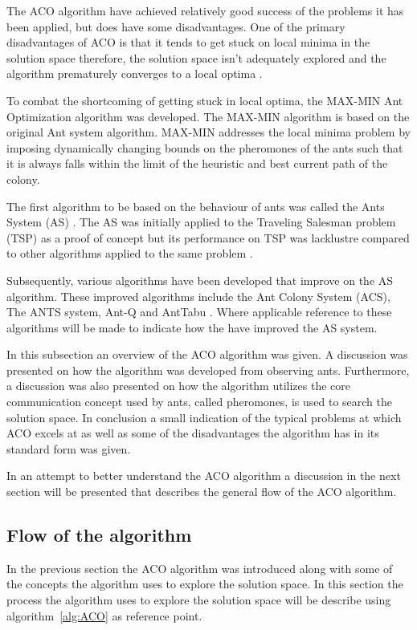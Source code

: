 The ACO algorithm have achieved relatively good success of the problems it has been applied, but does have some disadvantages\cite{ImpACOComplex,ACOSurvey}. One of the primary disadvantages of ACO is that it tends to get stuck on local minima in the solution space therefore, the solution space isn't adequately explored and the algorithm prematurely converges to a local optima \cite{ImpACOComplex}.

To combat the shortcoming of getting stuck in local optima, the MAX-MIN Ant Optimization algorithm was developed. The MAX-MIN algorithm is based on the original Ant system algorithm. MAX-MIN addresses the local minima problem by imposing dynamically changing bounds on the pheromones of the ants such that it is always falls within the limit of the heuristic and best current path of the colony\cite{GangWangACO}.

The first algorithm to be based on the behaviour of ants was called the Ants System (AS) \cite{CompuIntelligenceIntro,AntIntroTrends}. The AS was initially applied to the Traveling Salesman problem (TSP) as a proof of concept but its performance on TSP was lacklustre compared to other algorithms applied to the same problem \cite{CompuIntelligenceIntro,AntIntroTrends}. 

Subsequently, various algorithms have been developed that improve on the AS algorithm. These improved algorithms include the Ant Colony System (ACS), The ANTS system, Ant-Q and AntTabu \cite{CompuIntelligenceIntro,AntIntroTrends}. Where applicable reference to these algorithms will be made to indicate how the have improved the AS system.

In this subsection an overview of the ACO algorithm was given. A discussion was presented on how the algorithm was developed from observing ants. Furthermore, a discussion was also presented on how the algorithm utilizes the core communication concept used by ants, called pheromones, is used to search the solution space. In conclusion a small indication of the typical problems at which ACO excels at as well as some of the disadvantages the algorithm has in its standard form was given.

In an attempt to better understand the ACO algorithm a discussion in the next section will be presented that describes the general flow of the ACO algorithm.
\subsection{Flow of the algorithm}
In the previous section the ACO algorithm was introduced along with some of the concepts the algorithm uses to explore the solution space. In this section the process the algorithm uses to explore the solution space will be describe using algorithm~\ref{alg:ACO} as reference point.

